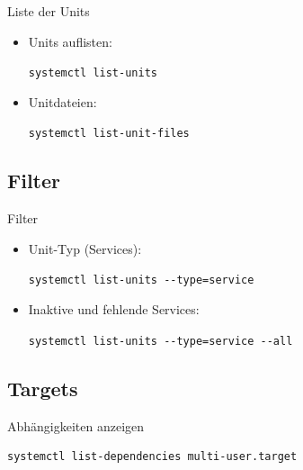 \begin{frame}[fragile]{Liste der Units}
  \begin{itemize}
    \item
Units auflisten:

    \verb|systemctl list-units|
    \item
Unitdateien:

\verb|systemctl list-unit-files|
  \end{itemize}
\end{frame}

\subsection{Filter}

\begin{frame}[fragile]{Filter}
  \begin{itemize}
    \item
	    Unit-Typ (Services):

    \verb|systemctl list-units --type=service|

\item
	Inaktive und fehlende Services:

    \verb|systemctl list-units --type=service --all|
  \end{itemize}
\end{frame}

%


\subsection{Targets}

\begin{frame}[fragile]{Abhängigkeiten anzeigen}
\begin{lstlisting}
systemctl list-dependencies multi-user.target
\end{lstlisting}
\end{frame}

